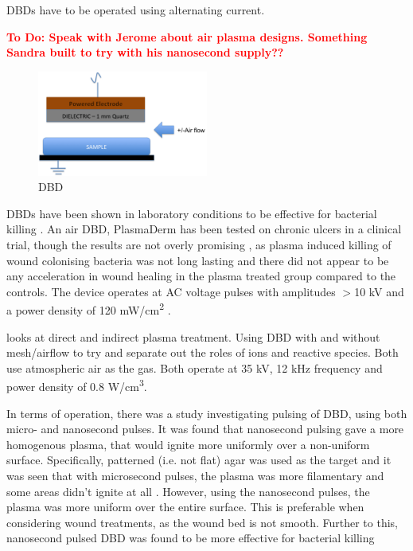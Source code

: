 \documentclass[11pt, oneside]{article}   	%
\newcommand{\todo}[1]{ \textcolor{red}{\bf{To Do:} #1}}
\begin{document}
DBDs have to be operated using alternating current.


\todo{Speak with Jerome about air plasma designs. Something Sandra built to try with his nanosecond supply??}


\begin{figure}
\centering
\includegraphics[width=0.5\textwidth]{Figures/DBD}
\caption{DBD}
\label{fig:DBD}
\end{figure}

DBDs have been shown in laboratory conditions to be effective for bacterial killing \cite{Daeschlein2012in, Fridman2006blood}.
An air DBD, PlasmaDerm has been tested on chronic ulcers in a clinical trial, though the results are not overly promising \cite{Brehmer2015alleviation}, as plasma induced killing of wound colonising bacteria was not long lasting and there did not appear to be any acceleration in wound healing in the plasma treated group compared to the controls.
The device operates at AC voltage pulses with amplitudes $>$10 kV and a power density of 120 mW/cm\textsuperscript{2} \cite{Brehmer2015alleviation}.



\cite{Fridman2007comparison} looks at direct and indirect plasma treatment. Using DBD with and without mesh/airflow to try and separate out the roles of ions and reactive species.
Both use atmospheric air as the gas.
Both operate at 35 kV, 12 kHz frequency and power density of 0.8 W/cm\textsuperscript{3}.

In terms of operation, there was a study investigating pulsing of DBD, using both micro- and nanosecond pulses. 
It was found that nanosecond pulsing gave a more homogenous plasma, that would ignite more uniformly over a non-uniform surface.
Specifically, patterned (i.e. not flat) agar was used as the target and it was seen that with microsecond pulses, the plasma was more filamentary and some areas didn't ignite at all \cite{Ayan2009application}. 
However, using the nanosecond pulses, the plasma was more uniform over the entire surface.
This is preferable when considering wound treatments, as the wound bed is not smooth.
Further to this, nanosecond pulsed DBD was found to be more effective for bacterial killing \cite{Ayan2008nanosecond}
\end{document}
